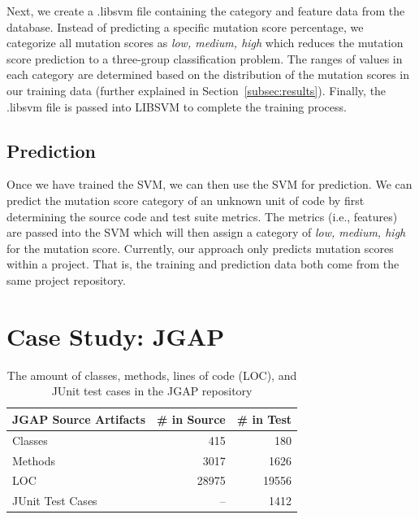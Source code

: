 \documentclass[10pt,conference,compsocconf]{IEEEtran}
\begin{document}
Next, we create a .libsvm file containing the category and feature data from the database. Instead of predicting a specific mutation score percentage, we categorize all mutation scores as \textit{low, medium, high} which reduces the mutation score prediction to a three-group classification problem. The ranges of values in each category are determined based on the distribution of the mutation scores in our training data (further explained in Section~\ref{subsec:results}). Finally, the .libsvm file is passed into LIBSVM to complete the training process.


\subsection{Prediction}
\label{subsec:prediction}
Once we have trained the SVM, we can then use the SVM for prediction. We can predict the mutation score category of an unknown unit of code by first determining the source code and test suite metrics. The metrics (i.e., features) are passed into the SVM which will then assign a category of \textit{low, medium, high} for the mutation score.  Currently, our approach only predicts mutation scores within a project. That is, the training and prediction data both come from the same project repository.


\section{Case Study: JGAP}
\label{sec:case_study}
\begin{table}[!b]
  \caption{The amount of classes, methods, lines of code (LOC), and JUnit test cases in the JGAP repository}
  \centering
  \begin{tabular}{|l|r|r|}
    \hline
    \rowcolor[RGB]{169,196,223}
    \textbf{JGAP Source Artifacts} & \textbf{\# in Source} & \textbf{\# in Test} \\
    \hline Classes & 415 & 180 \\
    \hline Methods & 3017 & 1626 \\
    \hline LOC & 28975 & 19556 \\
    \hline JUnit Test Cases & -- & 1412\footnotemark[1] \\
    \hline
  \end{tabular}
  \label{tab:jgap_source_stats}
\end{table}
\end{document}
